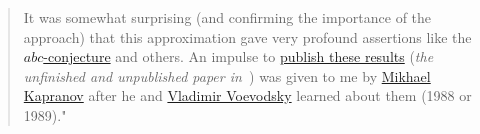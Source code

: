 \begin{quote}
  It was somewhat surprising (and confirming the importance of the approach) that this approximation gave very profound assertions like the \href{http://en.wikipedia.org/wiki/Abc_conjecture}{$abc$-conjecture} and others. An impulse to \href{http://matrix.cmi.ua.ac.be/ngeometry/library/Smirnov1991.pdf}{publish these results} (\emph{the unfinished and unpublished paper in~\cite{cohomology-determinants-and-reciprocity-laws}}) was given to me by \href{http://directory.math.yale.edu/public_html/People/mk486.html}{Mikhael Kapranov} after he and \href{http://en.wikipedia.org/wiki/Vladimir_Voevodsky}{Vladimir Voevodsky} learned about them (1988 or 1989)."
\end{quote} 

